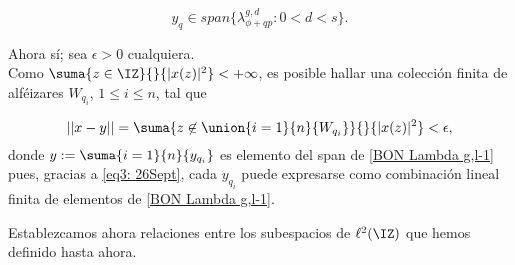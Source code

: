 \begin{dem}
\begin{equation}
\label{eq3: 26Sept}
y_{q} \in span\{ \lambda^{g,d}_{\phi+qp} : 0 < d < s \}. 
\end{equation}


Ahora sí; sea $\epsilon > 0$ cualquiera. \\
Como $\suma{z \in \IZ}{}{|x(z)|^{2}}< + \infty$,
es posible hallar una colección finita de alféizares
$W_{q_{i}}$, $1 \leq i \leq n$,
tal que

\[ || x-y || =
\suma{z \not\in \union{
i=1}{n}{W_{q_{i}}}}{}{|x(z)|^{2}} < \epsilon,
\]
donde $y:=\suma{i=1}{n}{y_{q_{i}}}$ 
es elemento del span de \eqref{BON Lambda g,l-1} pues,
gracias a \eqref{eq3: 26Sept},
cada $y_{q_{i}}$ puede expresarse como combinación lineal
finita de elementos de \eqref{BON Lambda g,l-1}.
\QEDB
\end{dem}

Establezcamos ahora relaciones entre los subespacios
de $\ell^{2}(\IZ)$ que hemos definido
hasta ahora.

